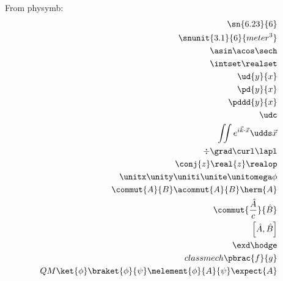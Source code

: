 \documentclass[hyperpdf,bindnopdf,twocolumn]{article}
\begin{document}
    From physymb:\\
    \begin{align*}
        \sn{6.23}{6}\\
        \snunit{3.1}{6}{meter^3}\\ %
        \asin \acos \sech \\
        \intset \realset \\
        \ud{y}{x}\\
        \pd{y}{x}\\
        \pddd{y}{x}\\
        \udc\\
        \iint e^{i\vec{k}\cdot\vec{x}}\udds\vec{x}\\ %
        \div \grad \curl \lapl\\
        \conj{z}  \real{z} \realop \\
        \unitx \unity \uniti \unite \unitomega \unit{\phi}\\
        \commut{A}{B} \acommut{A}{B}  \herm{A}\\
        \commut{\frac{\hat{A}}{c}}{\hat{B}}\\
        \left[\hat{A},\hat{B}\right]\\
        \exd \hodge \\
        classmech \pbrac{f}{g} \\
        QM \ket{\phi} \braket{\phi}{\psi} \melement{\phi}{A}{\psi} \expect{A}
    \end{align*}
    
\end{document}
